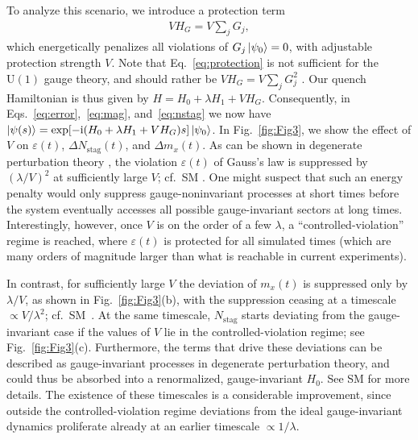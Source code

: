 \documentclass[aps,prl,reprint,twocolumn,superscriptaddress,floatfix,nofootinbib]{revtex4-1}
\begin{document}
	To analyze this scenario, we introduce a protection term 
	\begin{align}\label{eq:protection}
	VH_G=V\sum_jG_j,
	\end{align}
	which energetically penalizes all violations of $G_j\ket{\psi_0}=0$, with adjustable protection strength $V$. Note that Eq.~\eqref{eq:protection} is not sufficient for the $\mathrm{U}(1)$ gauge theory, and should rather be $VH_G=V\sum_jG_j^2$ \cite{SM0}. Our quench Hamiltonian is thus given by $H=H_0+\lambda H_1+VH_G$. Consequently, in Eqs.~\eqref{eq:error},~\eqref{eq:mag}, and~\eqref{eq:nstag} we now have $\ket{\psi(s)}=\exp[-\mathrm{i}(H_0+\lambda H_1+VH_G)s]\ket{\psi_0}$. 
	In Fig.~\ref{fig:Fig3}, we show the effect of $V$ on $\varepsilon(t)$, $\Delta N_\text{stag}(t)$, and $\Delta m_x(t)$. 
	As can be shown in degenerate perturbation theory \cite{SM2}, the violation $\varepsilon(t)$ of Gauss's law is suppressed by $(\lambda/V)^2$ at sufficiently large $V$; cf.~SM \cite{SM4}. One might suspect that such an energy penalty would only suppress gauge-noninvariant processes at short times before the system eventually accesses all possible gauge-invariant sectors at long times. Interestingly, however, once $V$ is on the order of a few $\lambda$, a ``controlled-violation'' regime is reached, where $\varepsilon(t)$ is protected for all simulated times (which are many orders of magnitude larger than what is reachable in current experiments). 
	
	In contrast, for sufficiently large $V$ the deviation of $m_{x}(t)$ is suppressed only by $\lambda/V$, as shown in Fig.~\ref{fig:Fig3}(b), with the 
	suppression ceasing at a timescale $\propto V/\lambda^2$; cf.~SM~\cite{SM4}.
	At the same timescale, $N_\text{stag}$ starts deviating from the gauge-invariant case if the values of $V$ lie in the controlled-violation regime; see Fig.~\ref{fig:Fig3}(c). Furthermore, the terms that drive these deviations can be described as gauge-invariant processes in degenerate perturbation theory, and could thus be absorbed into a renormalized, gauge-invariant $H_0$. See SM \cite{SM2} for more details. 
	The existence of these timescales is a considerable improvement, since outside the controlled-violation regime deviations from the ideal gauge-invariant dynamics proliferate already at an earlier timescale $\propto1/\lambda$.
	
\end{document}
